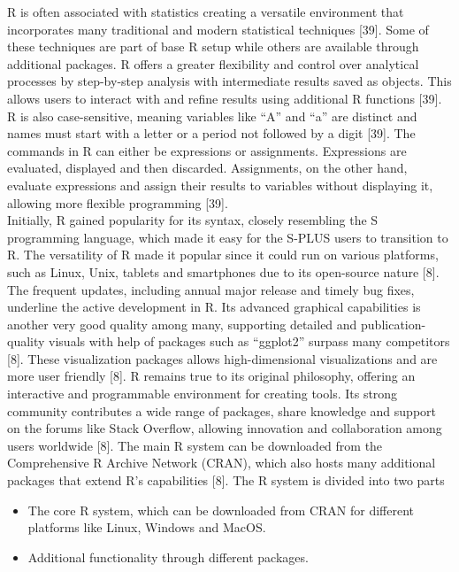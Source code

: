 \documentclass[12pt,a4paper]{report}
\begin{document}
R is often associated with statistics creating a versatile environment that incorporates many traditional and modern statistical techniques [39]. Some of these techniques are part of base R setup while others are available through additional packages. R offers a greater flexibility and control over analytical 
processes by step-by-step analysis with intermediate results saved as objects. This allows users to interact with and refine results using additional R functions [39].
R is also case-sensitive, meaning variables like “A” and “a” are distinct and names must start with a letter or a period not followed by a digit [39]. The commands in R can either be expressions or assignments. 
Expressions are evaluated, displayed and then discarded. Assignments, on the other hand, evaluate expressions and assign their results to variables without displaying it, allowing more flexible programming [39]. \\

Initially, R gained popularity for its syntax, closely resembling the S programming language, which made it easy for the S-PLUS users to transition to R. The versatility of R made it popular since it could run on various platforms, such as Linux, Unix, tablets and smartphones due to its open-source nature [8]. 
The frequent updates, including annual major release and timely bug fixes, underline the active development in R. Its advanced graphical capabilities is another very good quality among many, supporting detailed and publication-quality visuals with help of packages such as “ggplot2” surpass many competitors [8].
These visualization packages allows high-dimensional visualizations and are more user friendly [8]. R remains true to its original philosophy, offering an interactive and programmable environment for creating tools. Its strong community contributes a wide range of packages, share knowledge and support on the 
forums like Stack Overflow, allowing innovation and collaboration among users worldwide [8]. The main R system can be downloaded from the Comprehensive R Archive Network (CRAN), which also hosts many additional packages that extend R’s capabilities [8]. The R system is divided into two parts \\

\begin{itemize}
    \item The core R system, which can be downloaded from CRAN for different platforms like Linux, Windows and MacOS.
    \item Additional functionality through different packages.
\end{itemize}
\end{document}
